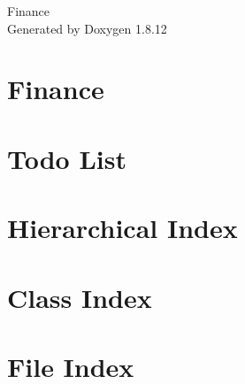 \documentclass[twoside]{book}
\newcommand{\+}{\discretionary{\mbox{\scriptsize$\hookleftarrow$}}{}{}}
\newcommand{\clearemptydoublepage}{%
  \newpage{\pagestyle{empty}\cleardoublepage}%
}
\begin{document}
\hypersetup{pageanchor=false,
             bookmarksnumbered=true,
             pdfencoding=unicode
            }
\begin{titlepage}
\vspace*{7cm}
\begin{center}%
{\Large Finance }\\
\vspace*{1cm}
{\large Generated by Doxygen 1.8.12}\\
\end{center}
\end{titlepage}
\clearemptydoublepage
{}
\tableofcontents
\clearemptydoublepage
{}
\hypersetup{pageanchor=true}

\chapter{Finance}
\label{md__r_e_a_d_m_e}
\hypertarget{md__r_e_a_d_m_e}{}

\chapter{Todo List}
\label{todo}
\hypertarget{todo}{}

\chapter{Hierarchical Index}

\chapter{Class Index}

\chapter{File Index}

\end{document}
